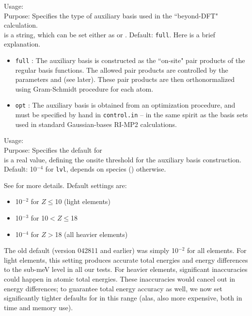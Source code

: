 { \noindent
  Usage:   \\[1.0ex]
  Purpose: Specifies the type of auxiliary basis used in the
  ``beyond-DFT" calculation. 
    \\[1.0ex]
   is a string, which can be set either as 
  or .   Default: \texttt{full}. Here is a brief explanation.
  \begin{itemize}
     \item  \texttt{full} : The auxiliary basis is constructed as
     the ``on-site" pair products of the regular basis functions. 
     The allowed pair products are controlled by the parameters 
      and
      (see later).
     These pair products
     are then orthonormalized using Gram-Schmidt procedure for each atom. 
     \item  \texttt{opt} : The auxiliary basis is obtained
     from an optimization procedure, and must be specified by
     hand in \texttt{control.in} -- in the same spirit as the basis
     sets used in standard Gaussian-bases RI-MP2 calculations.
  \end{itemize}
}

%
{ \noindent %
  Usage:   \\[1.0ex]
  Purpose: Specifies the default for \\[1.0ex]
   is a real value, defining the onsite threshold for the
  auxiliary basis construction.\\
  Default: 10$^{-4}$ for  \texttt{lvl}, depends on species
  () otherwise.  
}

See  for more details. Default settings are:
\begin{itemize}
  \item 10$^{-2}$ for $Z \le$10 (light elements)
  \item 10$^{-3}$ for 10$< Z \le$18
  \item 10$^{-4}$ for $Z >$18 (all heavier elements)
\end{itemize}
The old default (version 042811 and earlier) was simply 10$^{-2}$ for
all elements. For light elements, this setting produces accurate total
energies and energy differences to the sub-meV level in all our
tests. For heavier elements, significant inaccuracies could happen in
atomic total energies. These inaccuracies would cancel out in energy
differences; to guarantee total energy accuracy as well, we now set
significantly tighter defaults for 
in this range (alas, also more expensive, both in time and memory use).

